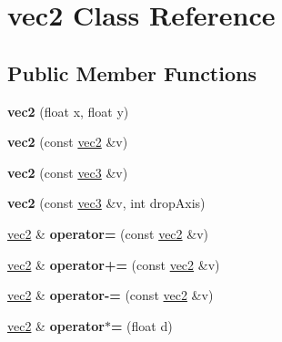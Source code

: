 \hypertarget{classvec2}{\section{vec2 Class Reference}
\label{classvec2}
}
\subsection*{Public Member Functions}
\begin{DoxyCompactItemize}
\item 
\hypertarget{classvec2_a9486933da4d4d819a8b99bae91066cb3}{{\bfseries vec2} (float x, float y)}\label{classvec2_a9486933da4d4d819a8b99bae91066cb3}

\item 
\hypertarget{classvec2_a7cd74dc60ec8bd02df85508cbdf1e0fd}{{\bfseries vec2} (const \hyperlink{classvec2}{vec2} \&v)}\label{classvec2_a7cd74dc60ec8bd02df85508cbdf1e0fd}

\item 
\hypertarget{classvec2_aae5f9f22b370adf75cd730c96c891c15}{{\bfseries vec2} (const \hyperlink{classvec3}{vec3} \&v)}\label{classvec2_aae5f9f22b370adf75cd730c96c891c15}

\item 
\hypertarget{classvec2_ac9a3a5609eca8ebe9767919c6ac028c6}{{\bfseries vec2} (const \hyperlink{classvec3}{vec3} \&v, int drop\-Axis)}\label{classvec2_ac9a3a5609eca8ebe9767919c6ac028c6}

\item 
\hypertarget{classvec2_aa287a5be89cde7e32c38f31d60667efd}{\hyperlink{classvec2}{vec2} \& {\bfseries operator=} (const \hyperlink{classvec2}{vec2} \&v)}\label{classvec2_aa287a5be89cde7e32c38f31d60667efd}

\item 
\hypertarget{classvec2_a67b9be8b71f13abba9d2cf7a41540a9d}{\hyperlink{classvec2}{vec2} \& {\bfseries operator+=} (const \hyperlink{classvec2}{vec2} \&v)}\label{classvec2_a67b9be8b71f13abba9d2cf7a41540a9d}

\item 
\hypertarget{classvec2_aeb9ecb6878a3d8a04ecb5a00daf19742}{\hyperlink{classvec2}{vec2} \& {\bfseries operator-\/=} (const \hyperlink{classvec2}{vec2} \&v)}\label{classvec2_aeb9ecb6878a3d8a04ecb5a00daf19742}

\item 
\hypertarget{classvec2_aab20fa966f702f2c1a7a472f6c64e657}{\hyperlink{classvec2}{vec2} \& {\bfseries operator$\ast$=} (float d)}\label{classvec2_aab20fa966f702f2c1a7a472f6c64e657}


\end{DoxyCompactItemize}
